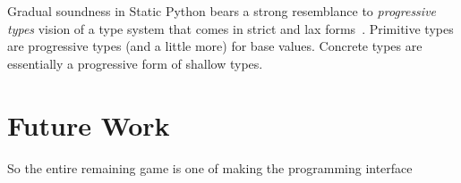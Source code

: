 \documentclass[english,cleveref,submission]{programming}
\newcommand{\SP}{Static Python}
\begin{document}
Gradual soundness in \SP{} bears a strong resemblance to \emph{progressive types} vision
of a type system that comes in strict and lax forms~\cite{pqk-onward-2012}.
Primitive types are progressive types (and a little more) for base values.
Concrete types are essentially a progressive form of shallow types.


\section{Future Work}
\label{s:future}




       So the entire remaining game is one of making the programming interface
\end{document}
